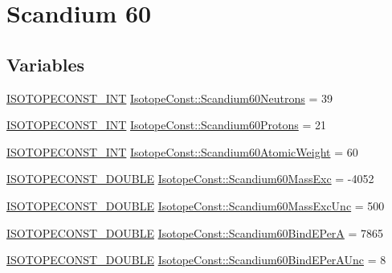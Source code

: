 \hypertarget{group___isotope_const-_scandium-_sc60}{}\section{Scandium 60}
\label{group___isotope_const-_scandium-_sc60}
\subsection*{Variables}
\begin{DoxyCompactItemize}
\item 
\mbox{\hyperlink{group___isotope_const-_macros_ga5f18360b3e99483a35c32d789e62621c}{I\+S\+O\+T\+O\+P\+E\+C\+O\+N\+S\+T\+\_\+\+I\+NT}} \mbox{\hyperlink{group___isotope_const-_scandium-_sc60_gae1f3acc095c82fea71c9c35d8722ce73}{Isotope\+Const\+::\+Scandium60\+Neutrons}} = 39
\item 
\mbox{\hyperlink{group___isotope_const-_macros_ga5f18360b3e99483a35c32d789e62621c}{I\+S\+O\+T\+O\+P\+E\+C\+O\+N\+S\+T\+\_\+\+I\+NT}} \mbox{\hyperlink{group___isotope_const-_scandium-_sc60_gaeefbaa0c718715cd009d40a36945dd6d}{Isotope\+Const\+::\+Scandium60\+Protons}} = 21
\item 
\mbox{\hyperlink{group___isotope_const-_macros_ga5f18360b3e99483a35c32d789e62621c}{I\+S\+O\+T\+O\+P\+E\+C\+O\+N\+S\+T\+\_\+\+I\+NT}} \mbox{\hyperlink{group___isotope_const-_scandium-_sc60_ga312069def56ac2b767a5f6df70403dc0}{Isotope\+Const\+::\+Scandium60\+Atomic\+Weight}} = 60
\item 
\mbox{\hyperlink{group___isotope_const-_macros_ga8f45a7272ce02c0b4c65c44636ed719a}{I\+S\+O\+T\+O\+P\+E\+C\+O\+N\+S\+T\+\_\+\+D\+O\+U\+B\+LE}} \mbox{\hyperlink{group___isotope_const-_scandium-_sc60_ga0354e38e5e7222e040e8c4f3bd2ed62b}{Isotope\+Const\+::\+Scandium60\+Mass\+Exc}} = -\/4052
\item 
\mbox{\hyperlink{group___isotope_const-_macros_ga8f45a7272ce02c0b4c65c44636ed719a}{I\+S\+O\+T\+O\+P\+E\+C\+O\+N\+S\+T\+\_\+\+D\+O\+U\+B\+LE}} \mbox{\hyperlink{group___isotope_const-_scandium-_sc60_ga91ada14ed529f6a2b04ed4480d2764d3}{Isotope\+Const\+::\+Scandium60\+Mass\+Exc\+Unc}} = 500
\item 
\mbox{\hyperlink{group___isotope_const-_macros_ga8f45a7272ce02c0b4c65c44636ed719a}{I\+S\+O\+T\+O\+P\+E\+C\+O\+N\+S\+T\+\_\+\+D\+O\+U\+B\+LE}} \mbox{\hyperlink{group___isotope_const-_scandium-_sc60_ga4690e6cc35fb84ac942d1e424b9b9c34}{Isotope\+Const\+::\+Scandium60\+Bind\+E\+PerA}} = 7865
\item 
\mbox{\hyperlink{group___isotope_const-_macros_ga8f45a7272ce02c0b4c65c44636ed719a}{I\+S\+O\+T\+O\+P\+E\+C\+O\+N\+S\+T\+\_\+\+D\+O\+U\+B\+LE}} \mbox{\hyperlink{group___isotope_const-_scandium-_sc60_gaabb7b4617c9783fca12437e9fbb488d0}{Isotope\+Const\+::\+Scandium60\+Bind\+E\+Per\+A\+Unc}} = 8

\end{DoxyCompactItemize}

